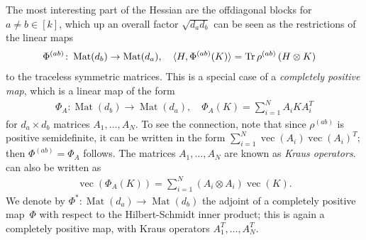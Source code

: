 \documentclass[aos]{imsart}
\theoremstyle{definition}
\numberwithin{equation}{section}
\DeclareMathOperator{\mat}{Mat}
\DeclareMathOperator{\tr}{Tr}
\DeclareMathOperator{\PD}{PD}
\DeclareMathOperator{\vect}{vec}
\newcommand{\ot}{\otimes}
\begin{document}
The most interesting part of the Hessian are the offdiagonal blocks for $a\neq b\in[k]$, which up an overall factor $\sqrt{d_a d_b}$ can be seen as the restrictions of the linear maps
\begin{align}\label{eq:hessian channel}
  \Phi^{(ab)} \colon \mat(d_b) \to \mat(d_a), \quad \braket{H, \Phi^{(ab)}(K)} &= \tr \rho^{(ab)} \left( H \ot K \right)
\end{align}
to the traceless symmetric matrices.
This is a special case of a \emph{completely positive map}, which is a linear map of the form
\begin{align}\label{eq:def cp}
  \Phi_A \colon \mat(d_b) \to \mat(d_a), \quad \Phi_A(K) = \sum_{i=1}^N A_i K A_i^T
\end{align}
for $d_a\times d_b$ matrices $A_1,\dots,A_N$.
To see the connection, note that since $\rho^{(ab)}$ is positive semidefinite, it can be written in the form $\sum_{i=1}^N \vect(A_i) \vect(A_i)^T$; then $\Phi^{(ab)} = \Phi_A$ follows.
The matrices $A_1,\dots,A_N$ are known as \emph{Kraus operators}.
 can also be written as
\begin{align*}
  \vect(\Phi_A(K)) = \sum_{i=1}^N (A_i \ot A_i) \vect(K).
\end{align*}
We denote by $\Phi^*\colon\mat(d_a)\to\mat(d_b)$ the adjoint of a completely positive map~$\Phi$ with respect to the Hilbert-Schmidt inner product; this is again a completely positive map, with Kraus operators $A_1^T,\dots,A_N^T$.
\end{document}
